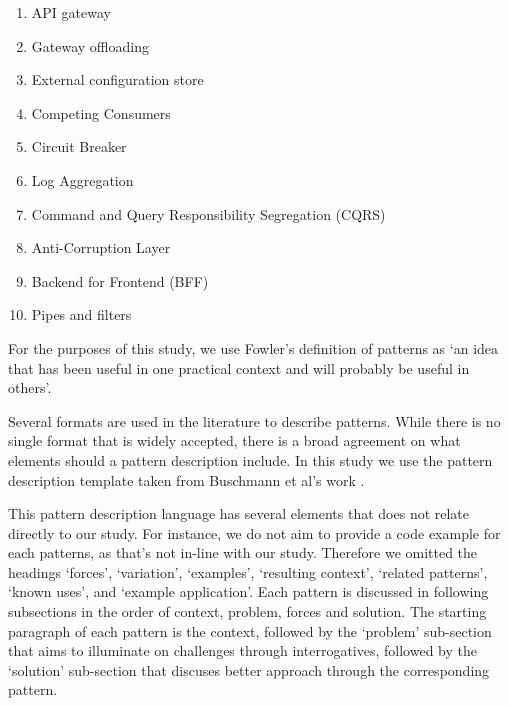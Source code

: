 \documentclass{bmcart}
\begin{document}
\begin{enumerate}
  \item API gateway 
  \item Gateway offloading 
  \item External configuration store
  \item Competing Consumers
  \item Circuit Breaker
  \item Log Aggregation
  \item Command and Query Responsibility Segregation (CQRS)
  \item Anti-Corruption Layer
  \item Backend for Frontend (BFF)
  \item Pipes and filters
\end{enumerate}
  
\hspace{1cm}

For the purposes of this study, we use Fowler's definition \cite{fowler1997analysis} of patterns as  `an idea that has been useful in one practical context and will probably be useful in others'.


Several formats are used in the literature to describe patterns. While there is no single format that is widely accepted, there is a broad agreement on what elements should a pattern description include. In this study we use the pattern description template taken from Buschmann et al's work \cite{buschmann2008pattern}. 

This pattern description language has several elements that does not relate directly to our study. For instance, we do not aim to provide a code example for each patterns, as that's not in-line with our study. Therefore we omitted the headings `forces', `variation', `examples', `resulting context', `related patterns', `known uses', and `example application'. Each pattern is discussed in following subsections in the order of context, problem, forces and solution. The starting paragraph of each pattern is the context, followed by the `problem' sub-section that aims to illuminate on challenges through interrogatives, followed by the `solution' sub-section that discuses better approach through the corresponding pattern.
\end{document}

